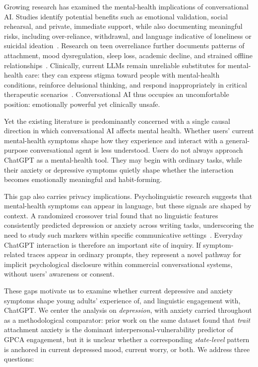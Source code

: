 \documentclass[letterpaper]{article}
\begin{document}
Growing research has examined the mental-health implications of conversational AI. Studies identify potential benefits such as emotional validation, social rehearsal, and private, immediate support, while also documenting meaningful risks, including over-reliance, withdrawal, and language indicative of loneliness or suicidal ideation~\citep{yuan2026mentalhealth,choi2025private}. Research on teen overreliance further documents patterns of attachment, mood dysregulation, sleep loss, academic decline, and strained offline relationships~\citep{namvarpour2026teenoverreliance}. Clinically, current LLMs remain unreliable substitutes for mental-health care: they can express stigma toward people with mental-health conditions, reinforce delusional thinking, and respond inappropriately in critical therapeutic scenarios~\citep{moore2025stigma}. Conversational AI thus occupies an uncomfortable position: emotionally powerful yet clinically unsafe.

Yet the existing literature is predominantly concerned with a single causal direction in which conversational AI affects mental health. Whether users' current mental-health symptoms shape how they experience and interact with a general-purpose conversational agent is less understood. Users do not always approach ChatGPT as a mental-health tool. They may begin with ordinary tasks, while their anxiety or depressive symptoms quietly shape whether the interaction becomes emotionally meaningful and habit-forming.

This gap also carries privacy implications. Psycholinguistic research suggests that mental-health symptoms can appear in language, but these signals are shaped by context. A randomized crossover trial found that no linguistic features consistently predicted depression or anxiety across writing tasks, underscoring the need to study such markers within specific communicative settings~\citep{odea2025linguistic}. Everyday ChatGPT interaction is therefore an important site of inquiry. If symptom-related traces appear in ordinary prompts, they represent a novel pathway for implicit psychological disclosure within commercial conversational systems, without users' awareness or consent.

These gaps motivate us to examine whether current depressive and anxiety symptoms shape young adults' experience of, and linguistic engagement with, ChatGPT. We center the analysis on \emph{depression}, with anxiety carried throughout as a methodological comparator: prior work on the same dataset \citep{anon2026attachment} found that \emph{trait} attachment anxiety is the dominant interpersonal-vulnerability predictor of GPCA engagement, but it is unclear whether a corresponding \emph{state-level} pattern is anchored in current depressed mood, current worry, or both. We address three questions:
\end{document}
